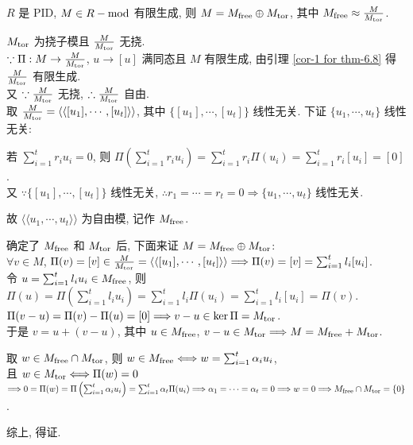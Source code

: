 \documentclass{note}
\begin{document}
\begin{thm}[(课本定理 6.8)]\label{thm-6.8}
    $R$ 是 PID, $M\in R-\operatorname{mod}$ 有限生成, 则 $M=M_{\operatorname{free}}\oplus M_{\operatorname{tor}}$, 其中 $M_{\operatorname{free}}\approx\frac{M}{M_{\operatorname{tor}}}$.
\end{thm}
\begin{pf}
    $M_{\operatorname{tor}}$ 为挠子模且 $\frac{M}{M_{\operatorname{tor}}}$ 无挠.\\
    $\because\Pi:M\rightarrow\frac{M}{M_{\operatorname{tor}}}$, $u\rightarrow[u]$ 满同态且 $M$ 有限生成, 由引理 \ref{cor-1 for thm-6.8} 得 $\frac{M}{M_{\operatorname{tor}}}$ 有限生成.\\
    又 $\because\frac{M}{M_{\operatorname{tor}}}$ 无挠, $\therefore\frac{M}{M_{\operatorname{tor}}}$ 自由.\\
    取 $\frac{M}{M_{\operatorname{tor}}}=\langle\langle[u_1],\cdots,[u_t]\rangle\rangle$, 其中 $\{[u_1],\cdots,[u_t]\}$ 线性无关. 下证 $\{u_1,\cdots,u_t\}$ 线性无关:
    \begin{pf}
        若 $\sum_{i=1}^tr_iu_i=0$, 则 $\Pi\left(\sum_{i=1}^tr_iu_i\right)=\sum_{i=1}^tr_i\Pi(u_i)=\sum_{i=1}^tr_i[u_i]=[0]$.\\
        又 $\because\{[u_1],\cdots,[u_t]\}$ 线性无关, $\therefore r_1=\cdots=r_t=0\Longrightarrow\{u_1,\cdots,u_t\}$ 线性无关.
    \end{pf}
    故 $\langle\langle u_1,\cdots,u_t\rangle\rangle$ 为自由模, 记作 $M_{\operatorname{free}}$.

    确定了 $M_{\operatorname{free}}$ 和 $M_{\operatorname{tor}}$ 后, 下面来证 $M=M_{\operatorname{free}}\oplus M_{\operatorname{tor}}$:\\
    $\forall v\in M$, $\Pi(v)=[v]\in\frac{M}{M_{\operatorname{tor}}}=\langle\langle[u_1],\cdots,[u_t]\rangle\rangle\Longrightarrow\Pi(v)=[v]=\sum_{i=1}^tl_i[u_i]$.\\
    令 $u=\sum_{i=1}^tl_iu_i\in M_{\operatorname{free}}$, 则 $\Pi(u)=\Pi\left(\sum_{i=1}^tl_iu_i\right)=\sum_{i=1}^tl_i\Pi(u_i)=\sum_{i=1}^tl_i[u_i]=\Pi(v)$.\\
    $\Pi(v-u)=\Pi(v)-\Pi(u)=[0]\Longrightarrow v-u\in\ker\Pi=M_{\operatorname{tor}}$.\\
    于是 $v=u+(v-u)$, 其中 $u\in M_{\operatorname{free}}$, $v-u\in M_{\operatorname{tor}}\Longrightarrow M=M_{\operatorname{free}}+M_{\operatorname{tor}}$.

    取 $w\in M_{\operatorname{free}}\cap M_{\operatorname{tor}}$, 则 $w\in M_{\operatorname{free}}\Longleftrightarrow w=\sum_{i=1}^t\alpha_iu_i$,\\
    且 $w\in M_{\operatorname{tor}}\Longleftrightarrow\Pi(w)=0$\\
    $\Longrightarrow 0=\Pi(w)=\Pi\left(\sum_{i=1}^t\alpha_iu_i\right)=\sum_{i=1}^t\alpha_t\Pi(u_i)\Longrightarrow\alpha_1=\cdots=\alpha_t=0\Longrightarrow w=0\Longrightarrow M_{\operatorname{free}}\cap M_{\operatorname{tor}}=\{0\}$.

    综上, 得证.
\end{pf}
\end{document}
